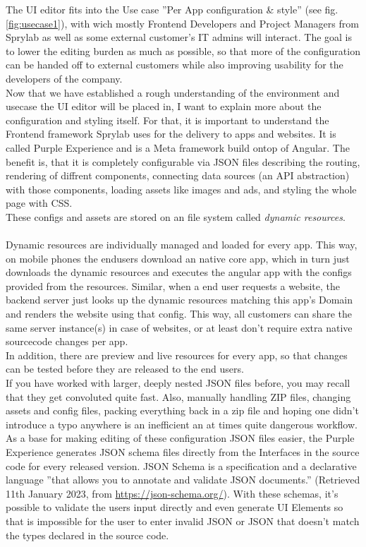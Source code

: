 The UI editor fits into the Use case ''Per App configuration \& style'' (see fig. \ref*{fig:usecase1}), with wich mostly Frontend Developers and Project Managers from Sprylab as well as some external customer's IT admins will interact. The goal is to lower the editing burden as much as possible, so that more of the configuration can be handed off to external customers while also improving usability for the developers of the company.
\\
Now that we have established a rough understanding of the environment and usecase the UI editor will be placed in, I want to explain more about the configuration and styling itself.
For that, it is important to understand the Frontend framework Sprylab uses for the delivery to apps and websites. It is called Purple Experience and is a Meta framework build ontop of Angular. The benefit is, that it is completely configurable via JSON files describing the routing, rendering of diffrent components,
connecting data sources (an API abstraction) with those components, loading assets like images and ads, and styling the whole page with CSS.
\\
These configs and assets are stored on an file system called \label{def:DynamicResources} \textit{dynamic resources}.
\\\\
Dynamic resources are individually managed and loaded for every app. This way, on mobile phones the endusers download an native core app, which in turn just downloads the dynamic resources and executes the angular app with the configs provided from the resources.
Similar, when a end user requests a website, the backend server just looks up the dynamic resources matching this app's Domain and renders the website using that config.
This way, all customers can share the same server instance(s) in case of websites, or at least don't require extra native sourcecode changes per app.
\\
In addition, there are preview and live resources for every app, so that changes can be tested before they are released to the end users.
\\
If you have worked with larger, deeply nested JSON files before, you may recall that they get convoluted quite fast.
Also, manually handling ZIP files, changing assets and config files, packing everything back in a zip file and hoping one didn't introduce a typo anywhere is an inefficient an at times quite dangerous workflow.
\\
As a base for making editing of these configuration JSON files easier, the Purple Experience generates JSON schema files directly from the Interfaces in the source code for every released version.
JSON Schema is a specification and a declarative language ''that allows you to annotate and validate JSON documents.'' (Retrieved 11th January 2023, from \url{https://json-schema.org/}).
With these schemas, it's possible to validate the users input directly and even generate UI Elements so that is impossible for the user to enter invalid JSON or JSON that doesn't match the
types declared in the source code.

